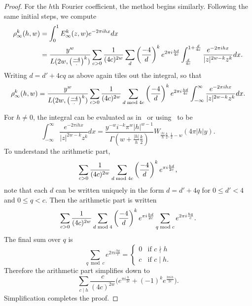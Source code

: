 \begin{proof}
  For the $h$th Fourier coefficient, the method begins similarly.
  Following the same initial steps, we compute
  \begin{align}
    \rho_\infty^k(h,w) &= \int_0^1 E_\infty^k(z,w) e^{-2\pi i h x} dx \\
    &=
    \frac{y^w}{L(2w, \left(\frac{-4}{\cdot}\right)^k)} \sum_{c > 0} \frac{1}{(4c)^{2w}} \sum_d
    \left(\frac{-4}{d}\right)^k e^{2\pi i \frac{hd}{4c}} \int_{\frac{d}{4c}}^{1 + \frac{d}{4c}}
    \frac{e^{-2\pi i h x}}{\lvert z \rvert^{2w - k} z^k} dx.
  \end{align}
  Writing $d = d' + 4cq$ as above again tiles out the integral, so that
  \begin{equation}
    \rho_\infty^k(h,w) = \frac{y^w}{L(2w, \left(\frac{-4}{\cdot}\right)^k)} \sum_{c > 0}
    \frac{1}{(4c)^{2w}} \sum_{d\bmod 4c} \left(\frac{-4}{d}\right)^k e^{2\pi i \frac{hd}{4c}}
    \int_{-\infty}^{\infty} \frac{e^{-2\pi i h x}}{\lvert z \rvert^{2w - k} z^k} dx.
  \end{equation}

  For $h \neq 0$, the integral can be evaluated as in~\cite[\S13.7]{Iwaniec97} or
  using~\cite[3.385.9]{GradshteynRyzhik07} to be
  \begin{equation}\label{eq:IntegralIdentity_hth}
    \int_{-\infty}^{\infty} \frac{e^{-2\pi i h x}}{\lvert z \rvert^{2w - k} z^k} dx =
    \frac{y^{-w} i^{-k} \pi^w \lvert h \rvert^{w-1}}{\Gamma(w + \frac{\lvert h \rvert}{h}
    \frac{k}{2})} W_{\frac{\lvert h \rvert}{h}\frac{k}{2}, \frac{1}{2} - w}(4\pi \lvert h
  \rvert y).
  \end{equation}
  To understand the arithmetic part,
  \begin{equation}
    \sum_{c > 0} \frac{1}{(4c)^{2w}} \sum_{d \bmod 4c} \left(\frac{-4}{d}\right)^k e^{\pi i \frac{hd}{2c}},
  \end{equation}
  note that each $d$ can be written uniquely in the form $d = d' + 4q$ for $0 \leq d' < 4$
  and $0 \leq q < c$.
  Then the arithmetic part is written
  \begin{equation}
    \sum_{c > 0} \frac{1}{(4c)^{2w}} \sum_{d \bmod 4} \left(\frac{-4}{d}\right)^k e^{\pi i
  \frac{hd}{2c}} \sum_{q \bmod c} e^{2\pi i \frac{hq}{c}}.  \end{equation}
  The final sum over $q$ is
  \begin{equation}
    \sum_{q \bmod c} e^{2\pi i \frac{hq}{c}} = \begin{cases}
      0 & \text{if } c \nmid h \\
      c & \text{if } c \mid h.
    \end{cases}
  \end{equation}
  Therefore the arithmetic part simplifies down to
  \begin{equation}
    \sum_{c \mid h} \frac{c}{(4c)^{2w}} \big( e^{\pi i \frac{h}{2c}} + (-1)^k
  e^{\frac{3\pi i h}{2c}} \big).  \end{equation}
  Simplification completes the proof.
\end{proof}

